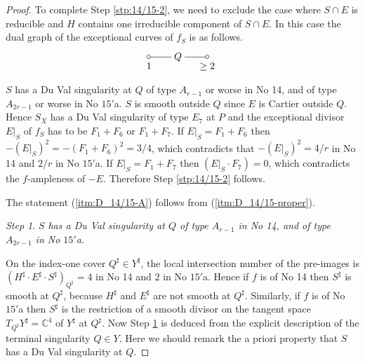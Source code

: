 \documentclass[a4paper,11pt]{amsart}
\theoremstyle{definition}
\theoremstyle{remark}
\newtheorem{step}{Step}
\numberwithin{equation}{section}
\newcommand{\bC}{{\mathbb C}}
\begin{document}
\begin{proof}
To complete Step \ref{stp:14/15-2},
we need to exclude the case where $S \cap E$ is reducible
and $H$ contains one irreducible component of $S \cap E$.
In this case the dual graph of the exceptional curves of $f_S$ is as follows.
\begin{align*}
\xymatrix@!0@=30pt{
*=<3.5pt>{\circ} \ar@{-}[r]_<*+{\>\!\!\!1} &
Q \ar@{-}[r]_>*+{\ \ge2} &
*=<3.5pt>{\circ}
}
\end{align*}
$S$ has a Du Val singularity at $Q$ of type $A_{r-1}$ or worse in No 14,
and of type $A_{2r-1}$ or worse in No $\textrm{15}'$a.
$S$ is smooth outside $Q$ since $E$ is Cartier outside $Q$.
Hence $S_X$ has a Du Val singularity of type $E_7$ at $P$ and
the exceptional divisor $E|_S$ of $f_S$ has to be $F_1+F_6$ or $F_1+F_7$.
If $E|_S=F_1+F_6$ then $-(E|_S)^2=-(F_1+F_6)^2=3/4$,
which contradicts that
$-(E|_S)^2=4/r$ in No 14 and $2/r$ in No $\textrm{15}'$a.
If $E|_S=F_1+F_7$ then $(E|_S \cdot F_7)=0$,
which contradicts the $f$-ampleness of $-E$.
Therefore Step \ref{stp:14/15-2} follows.

The statement (\ref{itm:D_14/15-A}) follows from (\ref{itm:D_14/15-proper}).

\begin{step}\label{stp:14/15-3}
\itshape
$S$ has a Du Val singularity at $Q$ of type $A_{r-1}$ in No 14,
and of type $A_{2r-1}$ in No $\textrm{15}'$a.
\end{step}

On the index-one cover $Q^\sharp \in Y^\sharp$,
the local intersection number of the pre-images is
$(H^\sharp \cdot E^\sharp \cdot S^\sharp)_{Q^\sharp}=4$ in No 14
and $2$ in No $\textrm{15}'$a.
Hence if $f$ is of No 14 then $S^\sharp$ is smooth at $Q^\sharp$,
because $H^\sharp$ and $E^\sharp$ are not smooth at $Q^\sharp$.
Similarly,
if $f$ is of No $\textrm{15}'$a
then $S^\sharp$ is the restriction of a smooth divisor
on the tangent space $T_{Q^\sharp}Y^\sharp=\bC^4$ of $Y^\sharp$ at $Q^\sharp$.
Now Step \ref{stp:14/15-3} is deduced from the explicit description
of the terminal singularity $Q \in Y$.
Here we should remark the a priori property that
$S$ has a Du Val singularity at $Q$.


\end{proof}
\end{document}
